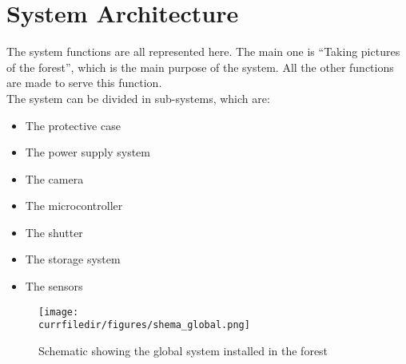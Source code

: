 \newpage
\section{System Architecture}

The system functions are all represented here. The main one is “Taking pictures of the forest”, which is the main purpose of the system. All the other functions are made to serve this function.
\\
The system can be divided in sub-systems, which are:
\begin{itemize}[label=\textbullet]
    \item The protective case
    \item The power supply system
    \item The camera
    \item The microcontroller
    \item The shutter
    \item The storage system
    \item The sensors
\end{itemize}


\begin{figure}[!h]
    \centering
    \texttt{[image: \\currfiledir/figures/shema\_global.png]}
    \caption{Schematic showing the global system installed in the forest}
\end{figure}
\tab \tab 











